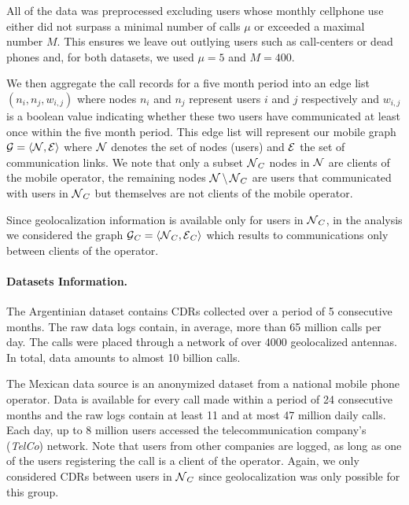 All of the data was preprocessed excluding users whose monthly cellphone use either did not surpass a minimal number of calls $\mu$ or exceeded a maximal number $M$.
This ensures we leave out outlying users such as call-centers or dead phones and, for both datasets, we used $\mu = 5$ and $M = 400$.

We then aggregate the call records for a five month period into an edge list $(n_i, n_j, w_{i,j})$ where nodes $n_i$ and $n_j$
represent users $i$ and $j$ respectively and $w_{i,j}$ is a boolean value indicating whether these two users have communicated at least once within the five month period.
This edge list will represent our mobile graph
$\operatorname{\mathcal{G}} = \left< \operatorname{\mathcal{N}}, \operatorname{\mathcal{E}} \right> $ where $\operatorname{\mathcal{N}}$ denotes the set of nodes (users) and $\operatorname{\mathcal{E}}$ the set of communication links.
We note that only a subset $\operatorname{\mathcal{N}}_C$ nodes in $\operatorname{\mathcal{N}}$ are clients of the mobile operator, the remaining nodes $\operatorname{\mathcal{N}} \setminus \operatorname{\mathcal{N}}_C$ are users that communicated with users in $ \operatorname{\mathcal{N}}_C $ but themselves are not clients of the mobile operator.

Since geolocalization information is available only for users in $\operatorname{\mathcal{N}}_C$, in the analysis we considered the graph $\operatorname{\mathcal{G}}_C = \left< \operatorname{\mathcal{N}}_C, \operatorname{\mathcal{E}}_C \right>$ which results to communications only between clients of the operator.

\paragraph{Datasets Information.}

The Argentinian dataset contains CDRs collected over a period of 5 consecutive months.
The raw data logs contain, in average, more than 65 million calls per day.
The calls were placed through a network of over 4000 geolocalized antennas.
In total, data amounts to almost 10 billion calls.

The Mexican data source is an anonymized dataset from a national mobile phone operator.
Data is available for every call made within a period of 24 consecutive months and the raw logs contain at least 11 and at most 47 million daily calls.
Each day, up to 8 million users accessed the telecommunication company's (\textit{TelCo}) network.
Note that users from other companies are logged, as long as one of the users registering the call is a client of the operator.
Again, we only considered CDRs between users in $\operatorname{\mathcal{N}}_C$ since geolocalization was only possible for this group.


